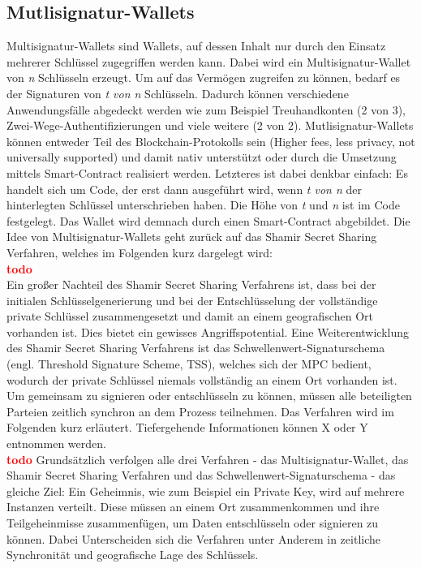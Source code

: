 \subsection{Mutlisignatur-Wallets}
\label{subsec:fundamentals:dlt:multisig}
Multisignatur-Wallets sind Wallets, auf dessen Inhalt nur durch den Einsatz mehrerer Schlüssel zugegriffen werden kann. Dabei wird ein Multisignatur-Wallet von \textit{n} Schlüsseln erzeugt. Um auf das Vermögen zugreifen zu können, bedarf es der Signaturen von \textit{t von n} Schlüsseln. Dadurch können verschiedene Anwendungsfälle abgedeckt werden wie zum Beispiel Treuhandkonten (2 von 3), Zwei-Wege-Authentifizierungen und viele weitere (2 von 2). Mutlisignatur-Wallets können entweder Teil des Blockchain-Protokolls sein (Higher fees, less privacy, not universally supported) und damit nativ unterstützt oder durch die Umsetzung mittels Smart-Contract realisiert werden. Letzteres ist dabei denkbar einfach: Es handelt sich um Code, der erst dann ausgeführt wird, wenn \textit{t von n} der hinterlegten Schlüssel unterschrieben haben. Die Höhe von \textit{t} und \textit{n} ist im Code festgelegt. Das Wallet wird demnach durch einen Smart-Contract abgebildet. Die Idee von Multisignatur-Wallets geht zurück auf das Shamir Secret Sharing Verfahren, welches im Folgenden kurz dargelegt wird:\\
\textbf{\textcolor{red}{todo}}\\
Ein großer Nachteil des Shamir Secret Sharing Verfahrens ist, dass bei der initialen Schlüsselgenerierung und bei der Entschlüsselung der vollständige private Schlüssel zusammengesetzt und damit an einem geografischen Ort vorhanden ist. Dies bietet ein gewisses Angriffspotential. Eine Weiterentwicklung des Shamir Secret Sharing Verfahrens ist das Schwellenwert-Signaturschema (engl. Threshold Signature Scheme, TSS), welches sich der \ac{MPC} bedient, wodurch der private Schlüssel niemals vollständig an einem Ort vorhanden ist. Um gemeinsam zu signieren oder entschlüsseln zu können, müssen alle beteiligten Parteien zeitlich synchron an dem Prozess teilnehmen. Das Verfahren wird im Folgenden kurz erläutert. Tiefergehende Informationen können X oder Y entnommen werden.\\
\textbf{\textcolor{red}{todo}}
Grundsätzlich verfolgen alle drei Verfahren - das Multisignatur-Wallet, das Shamir Secret Sharing Verfahren und das Schwellenwert-Signaturschema - das gleiche Ziel: Ein Geheimnis, wie zum Beispiel ein Private Key, wird auf mehrere Instanzen verteilt. Diese müssen an einem Ort zusammenkommen und ihre Teilgeheinmisse zusammenfügen, um Daten entschlüsseln oder signieren zu können. Dabei Unterscheiden sich die Verfahren unter Anderem in zeitliche Synchronität und geografische Lage des Schlüssels.


